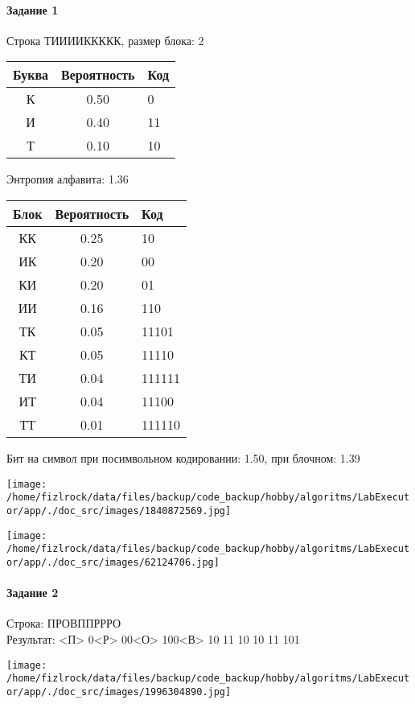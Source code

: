 \documentclass[a4paper, 12pt]{article}
\begin{document}
\paragraph{Задание 1}

Строка ТИИИИККККК, размер блока: 2
\begin{center}
 \begin{tabular}{ |c|c|l| } 
  \hline
     Буква & Вероятность & Код\\ \hline
К & 0.50 & 0\\\hline
И & 0.40 & 11\\\hline
Т & 0.10 & 10
\\ \hline \end{tabular}
\end{center}
Энтропия алфавита: 1.36
\begin{center}
 \begin{tabular}{ |c|c|l| } 
  \hline
     Блок & Вероятность & Код\\ \hline
КК & 0.25 & 10\\\hline
ИК & 0.20 & 00\\\hline
КИ & 0.20 & 01\\\hline
ИИ & 0.16 & 110\\\hline
ТК & 0.05 & 11101\\\hline
КТ & 0.05 & 11110\\\hline
ТИ & 0.04 & 111111\\\hline
ИТ & 0.04 & 11100\\\hline
ТТ & 0.01 & 111110
\\ \hline \end{tabular}
\end{center}
Бит на символ при посимвольном кодировании: 1.50, при блочном: 1.39

\texttt{[image: /home/fizlrock/data/files/backup/code\_backup/hobby/algoritms/LabExecutor/app/./doc\_src/images/1840872569.jpg]}

\texttt{[image: /home/fizlrock/data/files/backup/code\_backup/hobby/algoritms/LabExecutor/app/./doc\_src/images/62124706.jpg]}
\pagebreak
\paragraph{Задание 2}

Строка: 
ПРОВППРРРО\\
Результат: <П> 0<Р> 00<О> 100<В> 10 11 10 10 11 101

\texttt{[image: /home/fizlrock/data/files/backup/code\_backup/hobby/algoritms/LabExecutor/app/./doc\_src/images/1996304890.jpg]}
\end{document}
